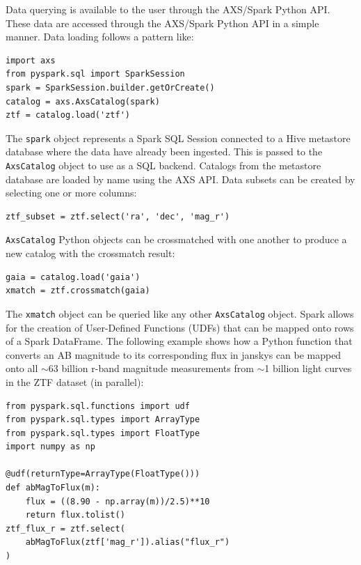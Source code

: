 \documentclass[twocolumn, linenumbers]{aastex631}
\begin{document}
Data querying is available to the user through the AXS/Spark Python API. These data are accessed through the AXS/Spark Python API in a simple manner. Data loading follows a pattern like:
\begin{lstlisting}[gobble=0]
import axs
from pyspark.sql import SparkSession
spark = SparkSession.builder.getOrCreate()
catalog = axs.AxsCatalog(spark)
ztf = catalog.load('ztf')
\end{lstlisting}
The \texttt{spark} object represents a Spark SQL Session connected to a Hive metastore database where the data have already been ingested. This is passed to the \texttt{AxsCatalog} object to use as a SQL backend. Catalogs from the metastore database are loaded by name using the AXS API. Data subsets can be created by selecting one or more columns:
\begin{lstlisting}[gobble=0]
ztf_subset = ztf.select('ra', 'dec', 'mag_r')
\end{lstlisting}
\texttt{AxsCatalog} Python objects can be crossmatched with one another to produce a new catalog with the crossmatch result:
\begin{lstlisting}[gobble=0]
gaia = catalog.load('gaia')
xmatch = ztf.crossmatch(gaia)
\end{lstlisting}
The \texttt{xmatch} object can be queried like any other \texttt{AxsCatalog} object. Spark allows for the creation of User-Defined Functions (UDFs) that can be mapped onto rows of a Spark DataFrame. The following example shows how a Python function that converts an AB magnitude to its corresponding flux in janskys can be mapped onto all ${\sim}$63 billion r-band magnitude measurements from ${\sim}$1 billion light curves in the ZTF dataset (in parallel):
\begin{lstlisting}[gobble=0]
from pyspark.sql.functions import udf
from pyspark.sql.types import ArrayType
from pyspark.sql.types import FloatType
import numpy as np

@udf(returnType=ArrayType(FloatType()))
def abMagToFlux(m):
    flux = ((8.90 - np.array(m))/2.5)**10
    return flux.tolist()
ztf_flux_r = ztf.select(
    abMagToFlux(ztf['mag_r']).alias("flux_r")
)
\end{lstlisting}
\end{document}
